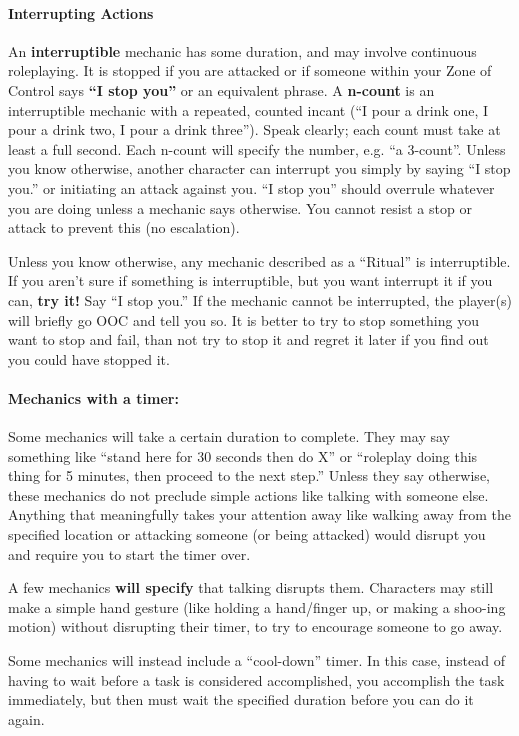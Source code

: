 \documentclass[sheet]{GL2020}
\begin{document}
\paragraph{Interrupting Actions}An {\bf interruptible} mechanic has some duration, and may involve continuous roleplaying. It is stopped if you are attacked or if someone within your Zone of Control says {\bf ``I stop you''} or an equivalent phrase. A {\bf n-count} is an interruptible mechanic with a repeated, counted incant (``I pour a drink one, I pour a drink two, I pour a drink three''). Speak clearly; each count must take at least a full second. Each n-count will specify the number, e.g. ``a 3-count''. Unless you know otherwise, another character can interrupt you simply by saying ``I stop you.'' or initiating an attack against you. ``I stop you'' should overrule whatever you are doing unless a mechanic says otherwise. You cannot resist a stop or attack to prevent this (no escalation).

Unless you know otherwise, any mechanic described as a ``Ritual'' is interruptible. If you aren't sure if something is interruptible, but you want interrupt it if you can, \textbf{try it!} Say ``I stop you.'' If the mechanic cannot be interrupted, the player(s) will briefly go OOC and tell you so. It is better to try to stop something you want to stop and fail, than not try to stop it and regret it later if you find out you could have stopped it.

\paragraph{Mechanics with a timer:} Some mechanics will take a certain duration to complete. They may say something like ``stand here for 30 seconds then do X'' or ``roleplay doing this thing for 5 minutes, then proceed to the next step.'' Unless they say otherwise, these mechanics do not preclude simple actions like talking with someone else. Anything that meaningfully takes your attention away like walking away from the specified location or attacking someone (or being attacked) would disrupt you and require you to start the timer over.

A few mechanics \textbf{will specify} that talking disrupts them. Characters may still make a simple hand gesture (like holding a hand/finger up, or making a shoo-ing motion) without disrupting their timer, to try to encourage someone to go away.

Some mechanics will instead include a ``cool-down'' timer. In this case, instead of having to wait before a task is considered accomplished, you accomplish the task immediately, but then must wait the specified duration before you can do it again. 
\end{document}
